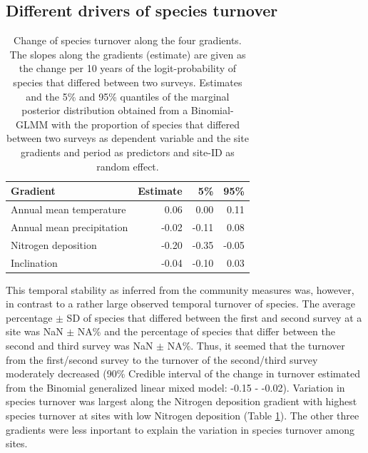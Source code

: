 \documentclass[fleqn,10pt,lineno]{wlpeerj} %
\theoremstyle{definition}
\theoremstyle{definition}
\theoremstyle{definition}
\theoremstyle{remark}
\begin{document}
\subsection*{Different drivers of species
turnover}\label{different-drivers-of-species-turnover}

\begin{table}

\caption{\label{tab:turnovertab}Change of species turnover along the four gradients. The slopes along the gradients (estimate) are given as the change per 10 years of the logit-probability of species that differed between two surveys. Estimates and the 5\% and 95\% quantiles of the marginal posterior distribution obtained from a Binomial-GLMM with the proportion of species that differed between two surveys as dependent variable and the site gradients and period as predictors and site-ID as random effect.}
\centering
\begin{tabular}[t]{lrrr}
\toprule
Gradient & Estimate & 5\% & 95\%\\
\midrule
Annual mean temperature & 0.06 & 0.00 & 0.11\\
Annual mean precipitation & -0.02 & -0.11 & 0.08\\
Nitrogen deposition & -0.20 & -0.35 & -0.05\\
Inclination & -0.04 & -0.10 & 0.03\\
\bottomrule
\end{tabular}
\end{table}

This temporal stability as inferred from the community measures was,
however, in contrast to a rather large observed temporal turnover of
species. The average percentage \(\pm\) SD of species that differed
between the first and second survey at a site was NaN \(\pm\) NA\% and
the percentage of species that differ between the second and third
survey was NaN \(\pm\) NA\%. Thus, it seemed that the turnover from the
first/second survey to the turnover of the second/third survey
moderately decreased (90\% Credible interval of the change in turnover
estimated from the Binomial generalized linear mixed model: -0.15 -
-0.02). Variation in species turnover was largest along the Nitrogen
deposition gradient with highest species turnover at sites with low
Nitrogen deposition (Table \ref{tab:turnovertab}). The other three
gradients were less inportant to explain the variation in species
turnover among sites.
\end{document}
